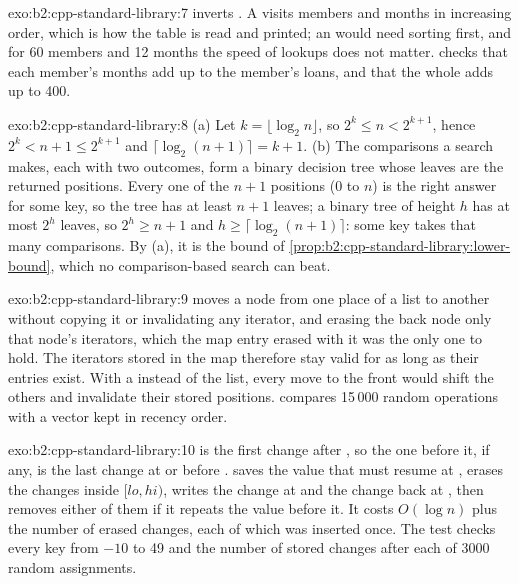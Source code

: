 \begin{solution}{exo:b2:cpp-standard-library:7}
 inverts . A  visits members and months in increasing order, which is
how the table is read and printed; an  would need sorting first, and for 60 members and 12
months the speed of lookups does not matter.  checks that each member's months add up
to the member's loans, and that the whole adds up to 400.
\end{solution}

\begin{solution}{exo:b2:cpp-standard-library:8}
(a) Let $k = \lfloor \log_2 n \rfloor$, so $2^k \leq n < 2^{k+1}$, hence $2^k < n + 1 \leq 2^{k+1}$ and
$\lceil \log_2 (n + 1) \rceil = k + 1$. (b) The comparisons a search makes, each with two outcomes, form a binary
decision tree whose leaves are the returned positions. Every one of the $n + 1$ positions (0 to $n$) is the right
answer for some key, so the tree has at least $n + 1$ leaves; a binary tree of height $h$ has at most $2^h$ leaves,
so $2^h \geq n + 1$ and $h \geq \lceil \log_2(n + 1) \rceil$: some key takes that many comparisons. By (a), it is
the bound of \cref{prop:b2:cpp-standard-library:lower-bound}, which no comparison-based search can beat.
\end{solution}

\begin{solution}{exo:b2:cpp-standard-library:9}
 moves a node from one place of a list to another without copying it or invalidating any iterator,
and erasing the back node  only that node's iterators, which the map entry erased with it was the only
one to hold. The iterators stored in the map therefore stay valid for as long as their entries exist. With a
 instead of the list, every move to the front would shift the others and invalidate their stored
positions.  compares 15\,000 random operations with a vector kept in recency order.
\end{solution}

\begin{solution}{exo:b2:cpp-standard-library:10}
 is the first change after , so the one before it, if any, is the last change at or
before .  saves the value that must resume at , erases the changes inside
$[lo, hi)$, writes the change at  and the change back at , then removes either of them if it
repeats the value before it. It costs $O(\log n)$ plus the number of erased changes, each of which was inserted
once. The test checks every key from $-10$ to 49 and the number of stored changes after each of 3000 random
assignments.
\end{solution}

